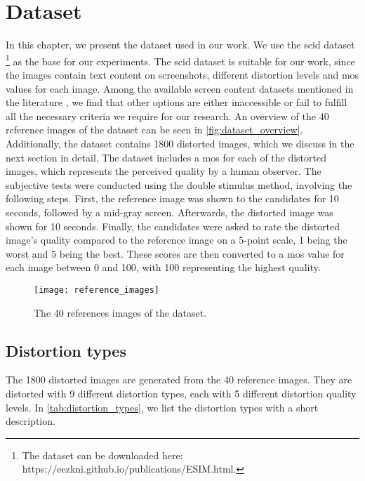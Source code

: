 \chapter{Dataset}
\label{chap:dataset}
In this chapter, we present the dataset used in our work.
We use the \gls{scid} dataset \cite{ni_esim_2017}\footnote{The dataset can be downloaded here: https://eezkni.github.io/publications/ESIM.html.} as the base for our experiments.
The \gls{scid} dataset is suitable for our work, since the images contain text content on screenshots, different distortion levels and \gls{mos} values for each image.
Among the available screen content datasets mentioned in the literature \cite{iqa_survey_2020}, we find that other options are either inaccessible or fail to fulfill all the necessary criteria we require for our research.
An overview of the 40 reference images of the dataset can be seen in \autoref{fig:dataset_overview}.
Additionally, the dataset contains 1800 distorted images, which we discuss in the next section in detail.
The dataset includes a \gls{mos} for each of the distorted images, which represents the perceived quality by a human observer.
The subjective tests were conducted using the double stimulus method, involving the following steps.
First, the reference image was shown to the candidates for 10 seconds, followed by a mid-gray screen.
Afterwards, the distorted image was shown for 10 seconds.
Finally, the candidates were asked to rate the distorted image's quality compared to the reference image on a 5-point scale, 1 being the worst and 5 being the best.
These scores are then converted to a \gls{mos} value for each image between 0 and 100, with 100 representing the highest quality.



\begin{figure}[h!]
    \centering
    \texttt{[image: reference\_images]}
    \caption{The 40 references images of the dataset.}
    \label{fig:dataset_overview}
\end{figure}


\section{Distortion types}
\label{sec:dataset_distortion_types}


The 1800 distorted images are generated from the 40 reference images.
They are distorted with 9 different distortion types, each with 5 different distortion quality levels.
In \autoref{tab:distortion_types}, we list the distortion types with a short description.



